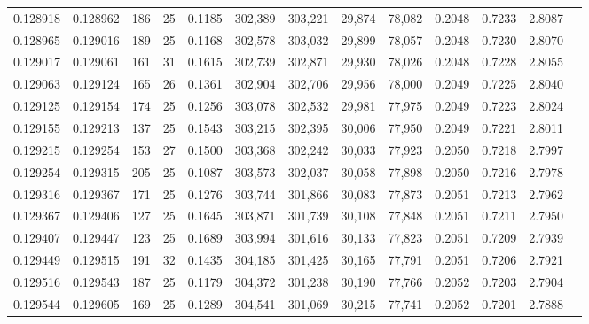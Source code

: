 \begin{tabular}{rrrrrrrrrrrrr}
0.128918 & 0.128962 & 186 &  25 &                                     0.1185 & 302,389 & 303,221 &  29,874 &  78,082 & 0.2048 & 0.7233 & 2.8087 \\
0.128965 & 0.129016 & 189 &  25 &                                     0.1168 & 302,578 & 303,032 &  29,899 &  78,057 & 0.2048 & 0.7230 & 2.8070 \\
0.129017 & 0.129061 & 161 &  31 &                                     0.1615 & 302,739 & 302,871 &  29,930 &  78,026 & 0.2048 & 0.7228 & 2.8055 \\
0.129063 & 0.129124 & 165 &  26 &                                     0.1361 & 302,904 & 302,706 &  29,956 &  78,000 & 0.2049 & 0.7225 & 2.8040 \\
0.129125 & 0.129154 & 174 &  25 &                                     0.1256 & 303,078 & 302,532 &  29,981 &  77,975 & 0.2049 & 0.7223 & 2.8024 \\
0.129155 & 0.129213 & 137 &  25 &                                     0.1543 & 303,215 & 302,395 &  30,006 &  77,950 & 0.2049 & 0.7221 & 2.8011 \\
0.129215 & 0.129254 & 153 &  27 &                                     0.1500 & 303,368 & 302,242 &  30,033 &  77,923 & 0.2050 & 0.7218 & 2.7997 \\
0.129254 & 0.129315 & 205 &  25 &                                     0.1087 & 303,573 & 302,037 &  30,058 &  77,898 & 0.2050 & 0.7216 & 2.7978 \\
0.129316 & 0.129367 & 171 &  25 &                                     0.1276 & 303,744 & 301,866 &  30,083 &  77,873 & 0.2051 & 0.7213 & 2.7962 \\
0.129367 & 0.129406 & 127 &  25 &                                     0.1645 & 303,871 & 301,739 &  30,108 &  77,848 & 0.2051 & 0.7211 & 2.7950 \\
0.129407 & 0.129447 & 123 &  25 &                                     0.1689 & 303,994 & 301,616 &  30,133 &  77,823 & 0.2051 & 0.7209 & 2.7939 \\
0.129449 & 0.129515 & 191 &  32 &                                     0.1435 & 304,185 & 301,425 &  30,165 &  77,791 & 0.2051 & 0.7206 & 2.7921 \\
0.129516 & 0.129543 & 187 &  25 &                                     0.1179 & 304,372 & 301,238 &  30,190 &  77,766 & 0.2052 & 0.7203 & 2.7904 \\
0.129544 & 0.129605 & 169 &  25 &                                     0.1289 & 304,541 & 301,069 &  30,215 &  77,741 & 0.2052 & 0.7201 & 2.7888 \\

\end{tabular}
